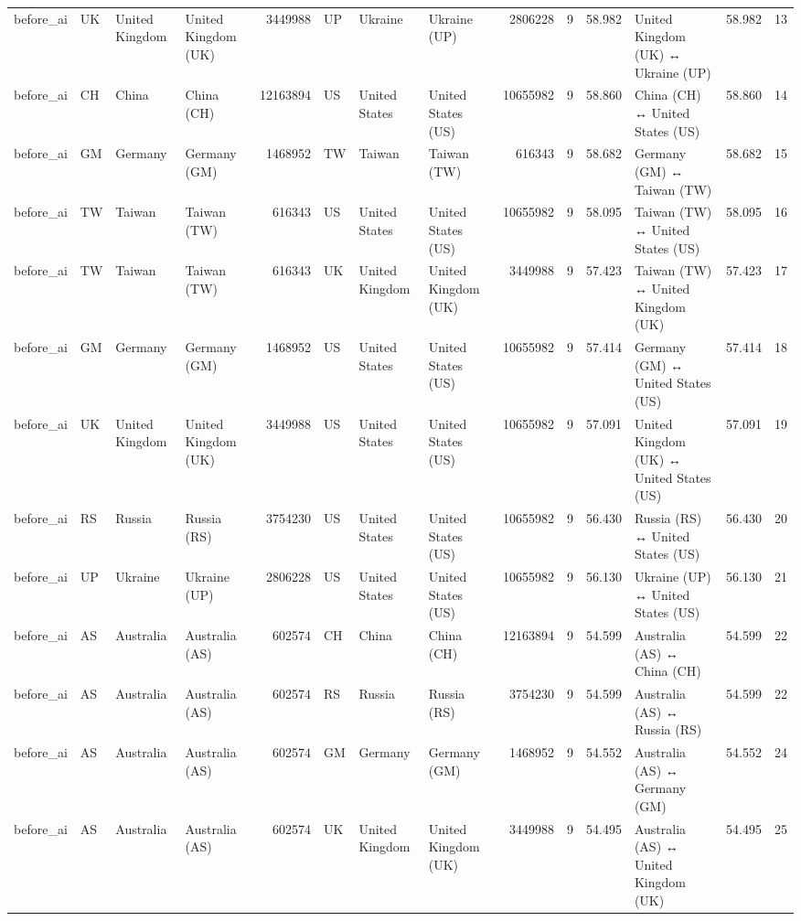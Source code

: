 \begin{tabular}{llllrlllrrrlrr}
before\_ai & UK & United Kingdom & United Kingdom (UK) & 3449988 & UP & Ukraine & Ukraine (UP) & 2806228 & 9 & 58.982 & United Kingdom (UK) ↔ Ukraine (UP) & 58.982 & 13 \\
before\_ai & CH & China & China (CH) & 12163894 & US & United States & United States (US) & 10655982 & 9 & 58.860 & China (CH) ↔ United States (US) & 58.860 & 14 \\
before\_ai & GM & Germany & Germany (GM) & 1468952 & TW & Taiwan & Taiwan (TW) & 616343 & 9 & 58.682 & Germany (GM) ↔ Taiwan (TW) & 58.682 & 15 \\
before\_ai & TW & Taiwan & Taiwan (TW) & 616343 & US & United States & United States (US) & 10655982 & 9 & 58.095 & Taiwan (TW) ↔ United States (US) & 58.095 & 16 \\
before\_ai & TW & Taiwan & Taiwan (TW) & 616343 & UK & United Kingdom & United Kingdom (UK) & 3449988 & 9 & 57.423 & Taiwan (TW) ↔ United Kingdom (UK) & 57.423 & 17 \\
before\_ai & GM & Germany & Germany (GM) & 1468952 & US & United States & United States (US) & 10655982 & 9 & 57.414 & Germany (GM) ↔ United States (US) & 57.414 & 18 \\
before\_ai & UK & United Kingdom & United Kingdom (UK) & 3449988 & US & United States & United States (US) & 10655982 & 9 & 57.091 & United Kingdom (UK) ↔ United States (US) & 57.091 & 19 \\
before\_ai & RS & Russia & Russia (RS) & 3754230 & US & United States & United States (US) & 10655982 & 9 & 56.430 & Russia (RS) ↔ United States (US) & 56.430 & 20 \\
before\_ai & UP & Ukraine & Ukraine (UP) & 2806228 & US & United States & United States (US) & 10655982 & 9 & 56.130 & Ukraine (UP) ↔ United States (US) & 56.130 & 21 \\
before\_ai & AS & Australia & Australia (AS) & 602574 & CH & China & China (CH) & 12163894 & 9 & 54.599 & Australia (AS) ↔ China (CH) & 54.599 & 22 \\
before\_ai & AS & Australia & Australia (AS) & 602574 & RS & Russia & Russia (RS) & 3754230 & 9 & 54.599 & Australia (AS) ↔ Russia (RS) & 54.599 & 22 \\
before\_ai & AS & Australia & Australia (AS) & 602574 & GM & Germany & Germany (GM) & 1468952 & 9 & 54.552 & Australia (AS) ↔ Germany (GM) & 54.552 & 24 \\
before\_ai & AS & Australia & Australia (AS) & 602574 & UK & United Kingdom & United Kingdom (UK) & 3449988 & 9 & 54.495 & Australia (AS) ↔ United Kingdom (UK) & 54.495 & 25 \\

\end{tabular}
